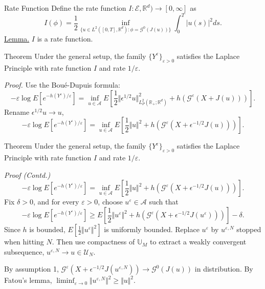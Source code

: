 \documentclass{if-beamer}
\begin{document}
\begin{frame}
    \begin{block}{Rate Function}
        Define the rate function $I: \mathcal{E}, \mathbb{R}^d) \to [0, \infty]$ as
        \[
            I(\phi) = \frac{1}{2} \inf_{\{u \in L^2([0, T], \mathbb{R}^d): \phi = \mathcal{G}^0(J(u))\}} \int_0^T |u(s)|^2 ds.
        \]
        \underline{Lemma.} $I$ is a rate function.
    \end{block}
    \begin{block}{Theorem}
        Under the general setup, the family $\{Y^{\varepsilon}\}_{\varepsilon > 0}$ satisfies the Laplace Principle with rate function $I$ and rate $1/ \varepsilon$.
    \end{block}
    \textit{Proof.} Use the Boué-Dupuis formula:
    \[
        -\varepsilon \log E\left[ e^{- h(Y^{\varepsilon}) / \varepsilon} \right] = \inf_{u \in \mathscr{A}} E\left[ 
            \frac{1}{2} \Vert \epsilon^{1/2} u \Vert^2_{L^2_P(\mathbb{R}_+; \mathbb{R}^d)} + h\left( \mathcal{G}^{\varepsilon}(X + J(u)) \right) \right]. 
    \]
    Rename $\epsilon^{1/2} u \to u$,
    \[
        -\varepsilon \log E\left[ e^{- h(Y^{\varepsilon}) / \varepsilon} \right] = \inf_{u \in \mathscr{A}} E\left[ 
            \frac{1}{2} \Vert u \Vert^2 + h\left( \mathcal{G}^{\varepsilon}(X + \epsilon^{-1/2} J(u)) \right) \right]. 
    \]
\end{frame}

\begin{frame}
    \begin{block}{Theorem}
        Under the general setup, the family $\{Y^{\varepsilon}\}_{\varepsilon > 0}$ satisfies the Laplace Principle with rate function $I$ and rate $1/ \varepsilon$.
    \end{block}
    \textit{Proof (Contd.)} 
    \[
        -\varepsilon \log E\left[ e^{- h(Y^{\varepsilon}) / \varepsilon} \right] = \inf_{u \in \mathscr{A}} E\left[ 
            \frac{1}{2} \Vert u \Vert^2 + h\left( \mathcal{G}^{\varepsilon}(X + \epsilon^{-1/2} J(u)) \right) \right]. 
    \]
    Fix $\delta > 0$, and for every $\varepsilon > 0$, choose $u^{\varepsilon} \in \mathscr{A}$ such that
    \[
        -\varepsilon \log E\left[ e^{- h(Y^{\varepsilon}) / \varepsilon} \right] \geq E\left[ 
            \frac{1}{2} \Vert u^{\varepsilon} \Vert^2 + h\left( \mathcal{G}^{\varepsilon}(X + \epsilon^{-1/2} J(u^{\varepsilon})) \right) \right] - \delta.
    \]
    Since $h$ is bounded, $E[ \frac{1}{2} \Vert u^{\varepsilon} \Vert^2 ]$ is uniformly bounded. Replace $u^{\varepsilon}$ by $u^{\varepsilon, N}$ stopped when hitting $N$.
    Then use compactness of $\mathbb{U}_M$ to extract a weakly convergent subsequence, $u^{\varepsilon, N} \to u \in \mathscr{U}_N$.
    
    By assumption 1, $\mathcal{G}^{\varepsilon}(X + \epsilon^{-1/2} J(u^{\varepsilon, N})) \to \mathcal{G}^0(J(u))$ in distribution. By Fatou's lemma,
    $\liminf_{\varepsilon \to 0} \Vert u^{\varepsilon, N} \Vert^2 \geq \Vert u \Vert^2$.

\end{frame}
\end{document}
